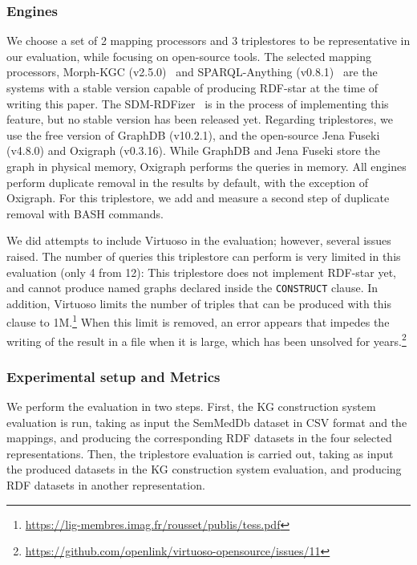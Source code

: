 \subsubsection{Engines}
\label{sec:chp6-1_engines}
We choose a set of 2 mapping processors and 3 triplestores to be representative in our evaluation, while focusing on open-source tools. The selected mapping processors, Morph-KGC (v2.5.0)~\citep{arenas2022morph} and SPARQL-Anything (v0.8.1)~\citep{asprino2023sparql-anything} are the systems with a stable version capable of producing RDF-star at the time of writing this paper. The SDM-RDFizer~\citep{iglesias2020rdfizer} is in the process of implementing this feature, but no stable version has been released yet. Regarding triplestores, we use the free version of GraphDB (v10.2.1), and the open-source Jena Fuseki (v4.8.0) and Oxigraph (v0.3.16). While GraphDB and Jena Fuseki store the graph in physical memory, Oxigraph performs the queries in memory. All engines perform duplicate removal in the results by default, with the exception of Oxigraph. For this triplestore, we add and measure a second step of duplicate removal with BASH commands.


We did attempts to include Virtuoso in the evaluation; however, several issues raised. The number of queries this triplestore can perform is very limited in this evaluation (only 4 from 12): This triplestore
does not implement RDF-star yet, and cannot produce named graphs declared inside the \texttt{CONSTRUCT} clause. In addition, Virtuoso limits the number of triples that can be produced with this clause to 1M.\footnote{\url{https://lig-membres.imag.fr/rousset/publis/tess.pdf}} When this limit is removed, an error appears that impedes the writing of the result in a file when it is large, which has been unsolved for years.\footnote{\url{https://github.com/openlink/virtuoso-opensource/issues/11}} 




\subsubsection{Experimental setup and Metrics}
\label{sec:chp6-1_exp-setup}
We perform the evaluation in two steps. First, the KG construction system evaluation is run, taking as input the SemMedDb dataset in CSV format and the mappings, and producing the corresponding RDF datasets in the four selected representations. Then, the triplestore evaluation is carried out, taking as input the produced datasets in the KG construction system evaluation, and producing RDF datasets in another representation.


